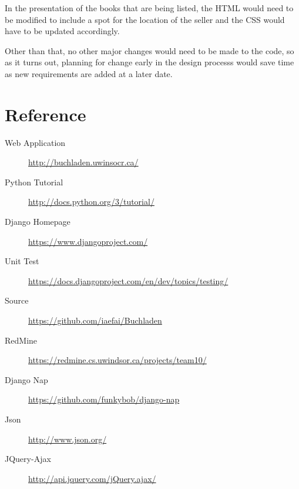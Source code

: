 \documentclass[11pt]{article}
\begin{document}
In the presentation of the books that are being listed, the HTML would
need to be modified to include a spot for the location of the seller
and the CSS would have to be updated accordingly.

Other than that, no other major changes would need to be made to the
code, so as it turns out, planning for change early in the design
processs would save time as new requirements are added at a later
date.


\newpage
\section{Reference}
\label{sec:reference}

\begin{description}
\item[Web Application] \href{http://buchladen.uwinsocr.ca/}{http://buchladen.uwinsocr.ca/}
\item[Python Tutorial] \href{http://docs.python.org/3/tutorial/}{http://docs.python.org/3/tutorial/}
\item[Django Homepage] \href{https://www.djangoproject.com/}{https://www.djangoproject.com/}
\item[Unit Test] \href{https://docs.djangoproject.com/en/dev/topics/testing/}{https://docs.djangoproject.com/en/dev/topics/testing/}
\item[Source] \href{https://github.com/iaefai/Buchladen}{https://github.com/iaefai/Buchladen}
\item[RedMine]
  \href{https://redmine.cs.uwindsor.ca/projects/team10/}{https://redmine.cs.uwindsor.ca/projects/team10/}
\item[Django Nap] \href{https://github.com/funkybob/django-nap}{https://github.com/funkybob/django-nap}
\item[Json] \href{http://www.json.org/}{http://www.json.org/}
\item[JQuery-Ajax] \href{http://api.jquery.com/jQuery.ajax/}{http://api.jquery.com/jQuery.ajax/}
\end{description}
\end{document}
